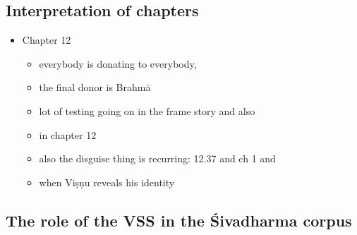 \documentclass[11pt]{book}
\begin{document}
\subsection{Interpretation of chapters}

\begin{itemize}

\item
  Chapter 12

  \begin{itemize}
  
  \item
    everybody is donating to everybody,
  \item
    the final donor is Brahmā
  \item
    lot of testing going on in the frame story and also
  \item
    in chapter 12
  \item
    also the disguise thing is recurring: 12.37 and ch 1 and
  \item
    when Viṣṇu reveals his identity
  \end{itemize}
\end{itemize}









\subsection{The role of the VSS in the Śivadharma corpus}
\end{document}
